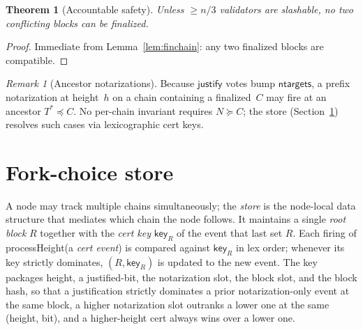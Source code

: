 \documentclass{article}
\newcommand{\just}{\ensuremath{\mathsf{justify}}\xspace}
\newcommand{\ntargets}{\mathsf{ntargets}}
\newcommand{\key}{\mathsf{key}}
\newcommand{\processHeight}{\textsf{processHeight}\xspace}
\theoremstyle{plain}
\newtheorem{theorem}{Theorem}
\theoremstyle{definition}
\theoremstyle{remark}
\newtheorem{remark}{Remark}
\begin{document}
\begin{theorem}[Accountable safety]\label{thm:safety}
Unless $\geq n/3$ validators are slashable, no two conflicting blocks can be finalized.
\end{theorem}

\begin{proof}
Immediate from Lemma~\ref{lem:finchain}: any two finalized blocks are compatible.
\end{proof}

\begin{remark}[Ancestor notarizations]\label{rem:notarization-safety}
Because \just votes bump $\ntargets$, a prefix notarization at height~$h$ on a chain containing a finalized~$C$ may fire at an ancestor $T^* \preceq C$.
No per-chain invariant requires $N \succeq C$; the store (Section~\ref{sec:store}) resolves such cases via lexicographic cert keys.
\end{remark}

\section{Fork-choice store}\label{sec:store}

A node may track multiple chains simultaneously; the \emph{store} is the node-local data structure that mediates which chain the node follows.
It maintains a single \emph{root block} $R$ together with the \emph{cert key} $\key_R$ of the event that last set $R$.
Each firing of \processHeight (a \emph{cert event}) is compared against $\key_R$ in lex order; whenever its key strictly dominates, $(R, \key_R)$ is updated to the new event.
The key packages height, a justified-bit, the notarization slot, the block slot, and the block hash, so that a justification strictly dominates a prior notarization-only event at the same block, a higher notarization slot outranks a lower one at the same (height, bit), and a higher-height cert always wins over a lower one.
\end{document}
